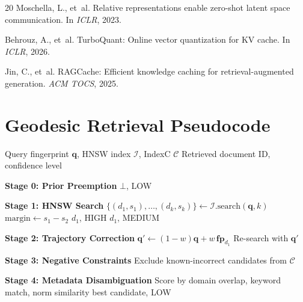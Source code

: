 \documentclass[11pt,twocolumn]{article}
\begin{document}
\begin{thebibliography}{20}
Moschella, L., et~al.
\newblock Relative representations enable zero-shot latent space
  communication.
\newblock In \emph{ICLR}, 2023.

Behrouz, A., et~al.
\newblock TurboQuant: Online vector quantization for KV cache.
\newblock In \emph{ICLR}, 2026.

Jin, C., et~al.
\newblock RAGCache: Efficient knowledge caching for retrieval-augmented
  generation.
\newblock \emph{ACM TOCS}, 2025.

\end{thebibliography}

\appendix

\section{Geodesic Retrieval Pseudocode}
\label{app:pseudocode}

\begin{algorithm}[H]
\caption{Geodesic Retrieval (4 stages)}
\label{alg:geodesic}
\begin{algorithmic}[1]
\Require Query fingerprint $\mathbf{q}$, HNSW index $\mathcal{I}$, IndexC $\mathcal{C}$
\Ensure Retrieved document ID, confidence level

\State \textbf{Stage 0: Prior Preemption}
  \State \Return $\bot$, LOW
\EndIf

\State \textbf{Stage 1: HNSW Search}
\State $\{(d_1, s_1), \ldots, (d_k, s_k)\} \gets \mathcal{I}.\text{search}(\mathbf{q}, k)$
\State $\text{margin} \gets s_1 - s_2$
  \State \Return $d_1$, HIGH
  \State \Return $d_1$, MEDIUM
\EndIf

\State \textbf{Stage 2: Trajectory Correction}
\State $\mathbf{q}' \gets (1-w)\mathbf{q} + w\,\mathbf{fp}_{d_1}$
\State Re-search with $\mathbf{q}'$

\State \textbf{Stage 3: Negative Constraints}
\State Exclude known-incorrect candidates from $\mathcal{C}$

\State \textbf{Stage 4: Metadata Disambiguation}
\State Score by domain overlap, keyword match, norm similarity
\State \Return best candidate, LOW
\end{algorithmic}
\end{algorithm}
\end{document}

